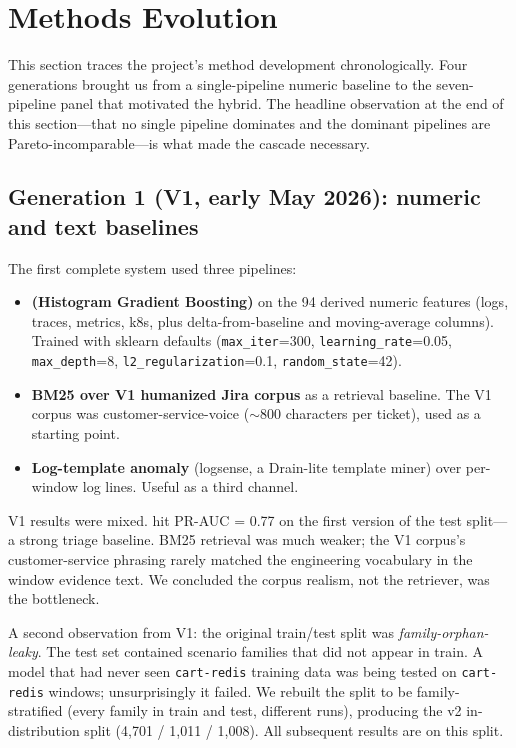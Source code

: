 \section{Methods Evolution}
\label{sec:methods-evolution}

This section traces the project's method development chronologically. Four generations brought us from a single-pipeline numeric baseline to the seven-pipeline panel that motivated the hybrid. The headline observation at the end of this section---that no single pipeline dominates and the dominant pipelines are Pareto-incomparable---is what made the cascade necessary.

\subsection{Generation 1 (V1, early May 2026): numeric and text baselines}

The first complete system used three pipelines:

\begin{itemize}
\item \textbf{\hgb{} (Histogram Gradient Boosting)} on the 94 derived numeric features (logs, traces, metrics, k8s, plus delta-from-baseline and moving-average columns). Trained with sklearn defaults (\texttt{max\_iter}=300, \texttt{learning\_rate}=0.05, \texttt{max\_depth}=8, \texttt{l2\_regularization}=0.1, \texttt{random\_state}=42).
\item \textbf{BM25 over V1 humanized Jira corpus} as a retrieval baseline. The V1 corpus was customer-service-voice ($\sim$800 characters per ticket), used as a starting point.
\item \textbf{Log-template anomaly} (logsense, a Drain-lite template miner) over per-window log lines. Useful as a third channel.
\end{itemize}

V1 results were mixed. \hgb{} hit PR-AUC = 0.77 on the first version of the test split---a strong triage baseline. BM25 retrieval was much weaker; the V1 corpus's customer-service phrasing rarely matched the engineering vocabulary in the window evidence text. We concluded the corpus realism, not the retriever, was the bottleneck.

A second observation from V1: the original train/test split was \emph{family-orphan-leaky}. The test set contained scenario families that did not appear in train. A model that had never seen \texttt{cart-redis} training data was being tested on \texttt{cart-redis} windows; unsurprisingly it failed. We rebuilt the split to be family-stratified (every family in train and test, different runs), producing the v2 in-distribution split (4{,}701 / 1{,}011 / 1{,}008). All subsequent results are on this split.

